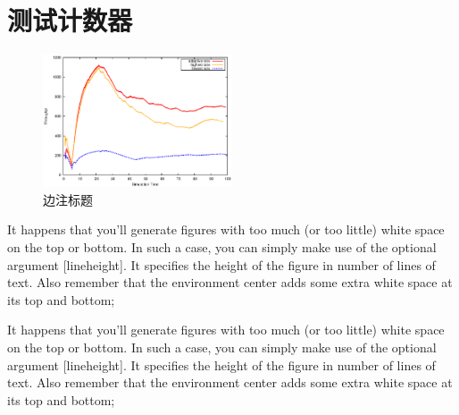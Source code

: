 \documentclass[fancyhdr,adobefonts,oneside,hyperref,openany,a4paper,UTF8]{ctexbook}
\begin{document}
\section{测试计数器}

\begin{figure}
  \centering
  \includegraphics[width=0.5\textwidth]{img/throughput}
  \caption{ 边注标题}
\end{figure}




It happens that you'll generate figures with too much (or too little) white space on the top or bottom. In such a case, you can simply make use of the optional argument [lineheight]. It specifies the height of the figure in number of lines of text. Also remember that the environment center adds some extra white space at its top and bottom;

It happens that you'll generate figures with too much (or too little) white space on the top or bottom. In such a case, you can simply make use of the optional argument [lineheight]. It specifies the height of the figure in number of lines of text. Also remember that the environment center adds some extra white space at its top and bottom;
\end{document}
